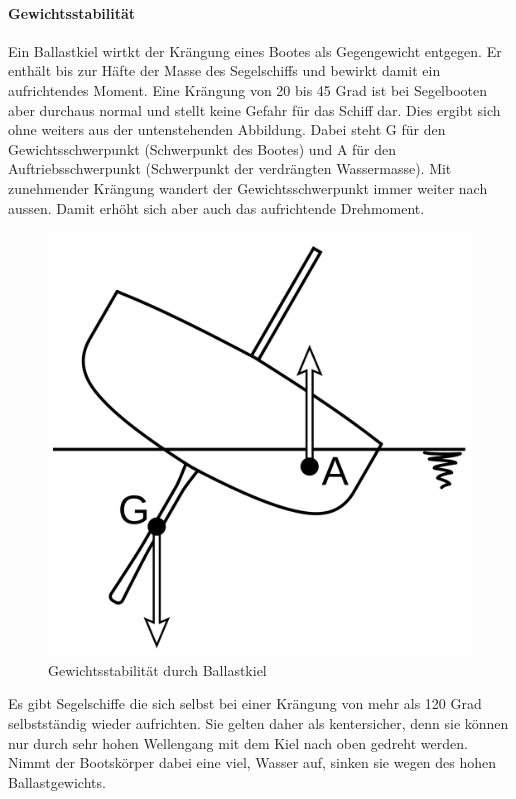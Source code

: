 \paragraph{Gewichtsstabilität}
Ein Ballastkiel wirtkt der Krängung eines Bootes als Gegengewicht entgegen. Er enthält bis zur Häfte der Masse des Segelschiffs und bewirkt damit ein aufrichtendes Moment. Eine Krängung von 20 bis 45 Grad ist bei Segelbooten aber durchaus normal und stellt keine Gefahr für das Schiff dar. Dies ergibt sich ohne weiters aus der untenstehenden Abbildung. Dabei steht G für den Gewichtsschwerpunkt (Schwerpunkt des Bootes) und A für den Auftriebsschwerpunkt (Schwerpunkt der verdrängten Wassermasse). Mit zunehmender Krängung wandert der Gewichtsschwerpunkt immer weiter nach aussen. Damit erhöht sich aber auch das aufrichtende Drehmoment. 
\begin{figure}[H]
    \centering
    \includegraphics[width=0.25\linewidth]{Segeln_Gewichtsstabilitaet.svg.png}
    \caption{Gewichtsstabilität durch Ballastkiel }
    \label{fig:enter-label}
\end{figure}
Es gibt Segelschiffe die sich selbst bei einer Krängung von mehr als 120 Grad selbstständig wieder aufrichten. Sie gelten daher als kentersicher, denn sie können nur durch sehr hohen Wellengang mit dem Kiel nach oben gedreht werden. Nimmt der Bootskörper dabei eine viel, Wasser auf, sinken sie wegen des hohen Ballastgewichts. 
